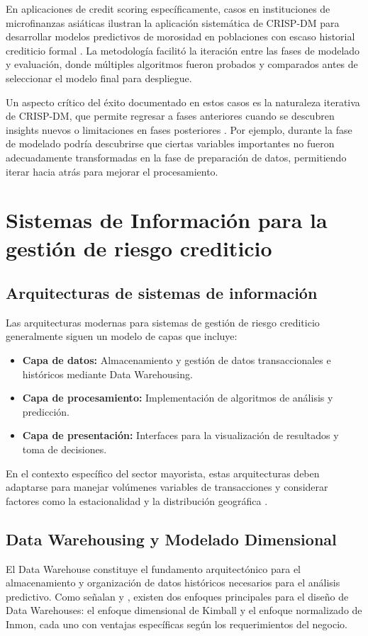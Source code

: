 En aplicaciones de credit scoring específicamente, casos en instituciones de microfinanzas asiáticas ilustran la aplicación sistemática de CRISP-DM para desarrollar modelos predictivos de morosidad en poblaciones con escaso historial crediticio formal \citep{martinez2019crisp}. La metodología facilitó la iteración entre las fases de modelado y evaluación, donde múltiples algoritmos fueron probados y comparados antes de seleccionar el modelo final para despliegue.

Un aspecto crítico del éxito documentado en estos casos es la naturaleza iterativa de CRISP-DM, que permite regresar a fases anteriores cuando se descubren insights nuevos o limitaciones en fases posteriores \citep{wirth2000crisp}. Por ejemplo, durante la fase de modelado podría descubrirse que ciertas variables importantes no fueron adecuadamente transformadas en la fase de preparación de datos, permitiendo iterar hacia atrás para mejorar el procesamiento.

\section{Sistemas de Información para la gestión de riesgo crediticio}
\subsection{Arquitecturas de sistemas de información}
Las arquitecturas modernas para sistemas de gestión de riesgo crediticio generalmente siguen un modelo de capas que incluye:

\begin{itemize}
    \item \textbf{Capa de datos:} Almacenamiento y gestión de datos transaccionales e históricos mediante Data Warehousing.
    \item \textbf{Capa de procesamiento:} Implementación de algoritmos de análisis y predicción.
    \item \textbf{Capa de presentación:} Interfaces para la visualización de resultados y toma de decisiones.
\end{itemize}

En el contexto específico del sector mayorista, estas arquitecturas deben adaptarse para manejar volúmenes variables de transacciones y considerar factores como la estacionalidad y la distribución geográfica \citep{kimball2013toolkit}.

\subsection{Data Warehousing y Modelado Dimensional}
El Data Warehouse constituye el fundamento arquitectónico para el almacenamiento y organización de datos históricos necesarios para el análisis predictivo. Como señalan \cite{kimball2013toolkit} y \cite{inmon2005building}, existen dos enfoques principales para el diseño de Data Warehouses: el enfoque dimensional de Kimball y el enfoque normalizado de Inmon, cada uno con ventajas específicas según los requerimientos del negocio.

